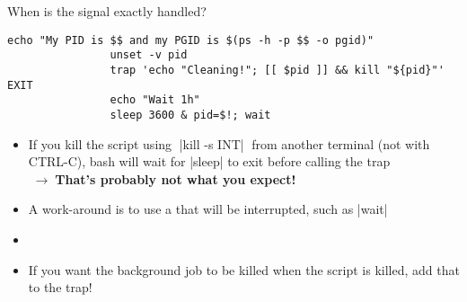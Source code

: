 \begin{frame}[fragile]{When is the signal exactly handled?}
\begin{overlayarea}{\textwidth}{0.33\textheight}
\begin{onlyenv}
\begin{lstlisting}[style=MyBash]
                echo "My PID is $$ and my PGID is $(ps -h -p $$ -o pgid)"
                unset -v pid
                trap 'echo "Cleaning!"; [[ $pid ]] && kill "${pid}"' EXIT
                echo "Wait 1h"
                sleep 3600 & pid=$!; wait
            \end{lstlisting}
        \end{onlyenv}
    \end{overlayarea}
    \begin{itemize}
        \item If you kill the script using $\;$\bash|kill -s INT|$\;$ from another terminal (not with CTRL-C), bash will wait for \bash|sleep| to exit before calling the trap\\
              $\;\to\;$\alert{\textbf{That's probably not what you expect!}}
        \item<2-> A work-around is to use a  that will be interrupted, such as \bash|wait|
        \item<2-> 
        \item<3-> If you want the background job to be killed when the script is killed, add that to the trap!
    \end{itemize}
\end{frame}
